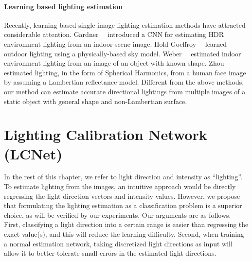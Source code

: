\paragraph{Learning based lighting estimation}
Recently, learning based single-image lighting estimation methods have attracted considerable attention. Gardner~\etal~\cite{gardner2017learning} introduced a CNN for estimating HDR environment lighting from an indoor scene image. Hold-Goeffroy~\etal~\cite{hold2017deep} learned outdoor lighting using a physically-based sky model. Weber~\etal~\cite{weber2018learning} estimated indoor environment lighting from an image of an object with known shape. Zhou~\etal~\cite{Zhou_2018_CVPR} estimated lighting, in the form of Spherical Harmonics, from a human face image by assuming a Lambertian reflectance model. Different from the above methods, our method can estimate accurate directional lightings from multiple images of a static object with general shape and non-Lambertian surface.

\section{Lighting Calibration Network (LCNet)}
\label{sec:lcnet}
In the rest of this chapter, we refer to light direction and intensity as ``lighting''.
To estimate lighting from the images, an intuitive approach would be directly regressing the light direction vectors and intensity values.
However, we propose that formulating the lighting estimation as a classification problem is a superior choice, as will be verified by our experiments. Our arguments are as follows. First, classifying a light direction into a certain range is easier than regressing the exact value(s), and this will reduce the learning difficulty. 
Second, when training a normal estimation network, taking discretized light directions as input will allow it to better tolerate small errors in the estimated light directions.

